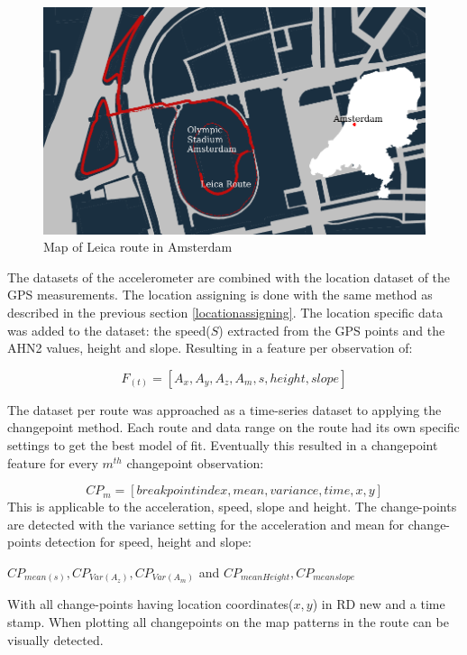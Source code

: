 \begin{figure}[hb]
\includegraphics[width=\textwidth]{img/M_overviewRouteLeica.pdf}
\centering
\caption{ Map of Leica route in Amsterdam\label{leicatracks}}
\end{figure}

The datasets of the accelerometer are combined with the location dataset of the GPS measurements. The location assigning is done with the same method as described in the previous section \ref{locationassigning}. The location specific data was added to the dataset: the speed($S$) extracted from the GPS points and the AHN2 values, height and slope. Resulting in a feature per observation of:

\begin{equation} 
	F_{(t)} = [ A_{x}, A_{y}, A_{z}, A_{m}, s, height, slope] 
\end{equation}

The dataset per route was approached as a time-series dataset to applying the changepoint method. Each route and data range on the route had its own specific settings to get the best model of fit. Eventually this resulted in a changepoint feature for every $m^{th}$ changepoint observation:

\begin{equation}
CP_{m} = [ breakpoint index, mean, variance, time, x,y]
\end{equation}
This is applicable to the acceleration, speed, slope and height. The change-points are detected with the variance setting for the acceleration and mean for change-points detection for speed, height and slope: 

$CP_{mean(s)}, CP_{Var(A_{z})}, CP_{Var(A_{m})}$ and $CP_{mean Height}, CP_{mean slope}$ 

With all change-points having location coordinates($x,y$) in RD new and a time stamp. When plotting all changepoints on the map patterns in the route can be visually detected.

